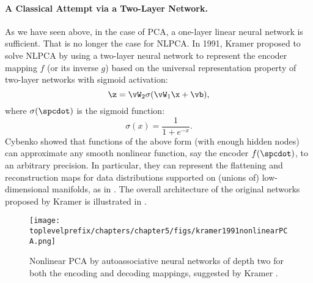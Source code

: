 \documentclass[../../book-main.tex]{subfiles}
\begin{document}
\paragraph{A Classical Attempt via a Two-Layer Network.} As we have
seen above, in the case of PCA, a one-layer linear neural
network is sufficient. That is no longer the case for NLPCA. In 1991, Kramer
\cite{Kramer1991NonlinearPC}  proposed to solve NLPCA by using a two-layer
neural network to represent the encoder mapping $f$ (or its inverse $g$) based
on the universal representation property of two-layer networks with sigmoid
activation:
\begin{equation}
  \z = \vW_2 \sigma(\vW_1\x +\vb),
\end{equation}
where $\sigma(\spcdot)$ is the sigmoid function:
\begin{equation}
  \sigma(x) = \frac{1}{1+ e^{-x}}.
\end{equation}
Cybenko \cite{Cybenko1989ApproximationBS} showed that functions of
the above form (with enough hidden nodes) can approximate any smooth
nonlinear function, say the encoder $f(\spcdot)$, to an arbitrary
precision. In particular, they can represent the flattening and reconstruction
maps for data distributions supported on (unions of) low-dimensional manifolds,
as in . The overall architecture of the
original networks proposed by Kramer is illustrated in .
\begin{figure}[tb]
  \centering
  \texttt{[image: \\toplevelprefix/chapters/chapter5/figs/kramer1991nonlinearPCA.png]}
  \caption{Nonlinear PCA by  autoassociative neural networks of depth
    two for both the encoding and decoding mappings, suggested by
  Kramer \cite{Kramer1991NonlinearPC}.}
  \label{fig:NLPCA}
\end{figure}
\end{document}
